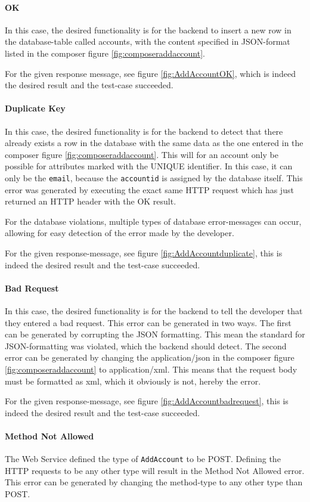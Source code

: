 \paragraph{OK}
In this case, the desired functionality is for the backend to insert a new row in the database-table called accounts, with the content specified in JSON-format listed in the composer figure \ref{fig:composeraddaccount}. 

For the given response message, see figure \ref{fig:AddAccountOK}, which is indeed the desired result and the test-case succeeded.
\paragraph{Duplicate Key}
In this case, the desired functionality is for the backend to detect that there already exists a row in the database with the same data as the one entered in the composer figure \ref{fig:composeraddaccount}. This will for an account only be possible for attributes marked with the UNIQUE identifier. In this case, it can only be the \texttt{email}, because the \texttt{accountid} is assigned by the database itself. This error was generated by executing the exact same HTTP request which has just returned an HTTP header with the OK result.

For the database violations, multiple types of database error-messages can occur, allowing for easy detection of the error made by the developer.

For the given response-message, see figure \ref{fig:AddAccountduplicate}, this is indeed the desired result and the test-case succeeded.
\paragraph{Bad Request}
In this case, the desired functionality is for the backend to tell the developer that they entered a bad request. This error can be generated in two ways. The first can be generated by corrupting the JSON formatting. This mean the standard for JSON-formatting was violated, which the backend should detect. The second error can be generated by changing the application/json in the composer figure \ref{fig:composeraddaccount} to application/xml. This means that the request body must be formatted as xml, which it obviously is not, hereby the error.

For the given response-message, see figure \ref{fig:AddAccountbadrequest}, this is indeed the desired result and the test-case succeeded.
\paragraph{Method Not Allowed}
The Web Service defined the type of \texttt{AddAccount} to be POST. Defining the HTTP requests to be any other type will result in the Method Not Allowed error. This error can be generated by changing the method-type to any other type than POST.

